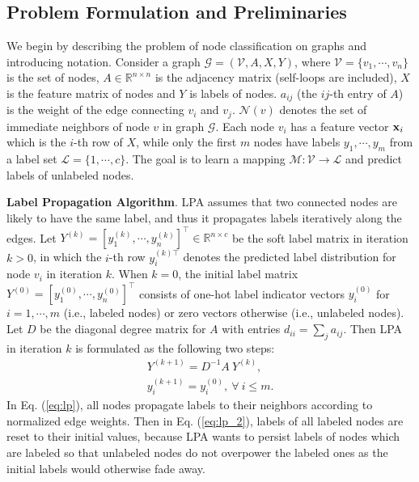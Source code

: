 \documentclass{article}
\begin{document}
	\subsection{Problem Formulation and Preliminaries}
		We begin by describing the problem of node classification on graphs and introducing notation.
		Consider a graph $\mathcal G = (\mathcal V, A, X, Y)$, where $\mathcal V = \{v_1,\cdots, v_n\}$ is the set of nodes, $A \in \mathbb R^{n \times n}$ is the adjacency matrix (self-loops are included), $X$ is the feature matrix of nodes and $Y$ is labels of nodes.
		$a_{ij}$ (the $ij$-th entry of $A$) is the weight of the edge connecting $v_i$ and $v_j$.
		$\mathcal N(v)$ denotes the set of immediate neighbors of node $v$ in graph $\mathcal G$.
		Each node $v_i$ has a feature vector ${\bf x}_i$ which is the $i$-th row of $X$, while only the first $m$ nodes have labels $y_1,\cdots, y_m$ from a label set $\mathcal L = \{1,\cdots, c\}$.
		The goal is to learn a mapping $\mathcal M: \mathcal V \rightarrow \mathcal L$ and predict labels of unlabeled nodes.
	
		\textbf{Label Propagation Algorithm}.
		LPA assumes that two connected nodes are likely to have the same label, and thus it propagates labels iteratively along the edges.
		Let $ Y^{(k)} = [y_1^{(k)},\cdots,  y_n^{(k)}]^\top \in \mathbb R^{n \times c}$ be the soft label matrix in iteration $k>0$, in which the $i$-th row $y_i^{{(k)}\top}$ denotes the predicted label distribution for node $v_i$ in iteration $k$.
		When $k=0$, the initial label matrix $Y^{(0)} = [y_1^{(0)},\cdots,  y_n^{(0)}]^\top$ consists of one-hot label indicator vectors $y_i^{(0)}$ for $i = 1,\cdots, m$ (i.e., labeled nodes) or zero vectors otherwise (i.e., unlabeled nodes).
		Let $D$ be the diagonal degree matrix for $A$ with entries $d_{ii} = \sum_j a_{ij}$.
		Then LPA \citep{zhu2005semi} in iteration $k$ is formulated as the following two steps:
		\begin{eqnarray}
			Y^{(k+1)} = D^{-1} A \ Y^{(k)}, \label{eq:lp}\\
			y_i^{(k+1)} = y_i^{(0)}, \ \forall \ i \le m. \label{eq:lp_2}
		\end{eqnarray}
		In Eq. (\ref{eq:lp}), all nodes propagate labels to their neighbors according to normalized edge weights.
		Then in Eq. (\ref{eq:lp_2}), labels of all labeled nodes are reset to their initial values, because LPA wants to persist labels of nodes which are labeled so that unlabeled nodes do not overpower the labeled ones as the initial labels would otherwise fade away.
\end{document}
